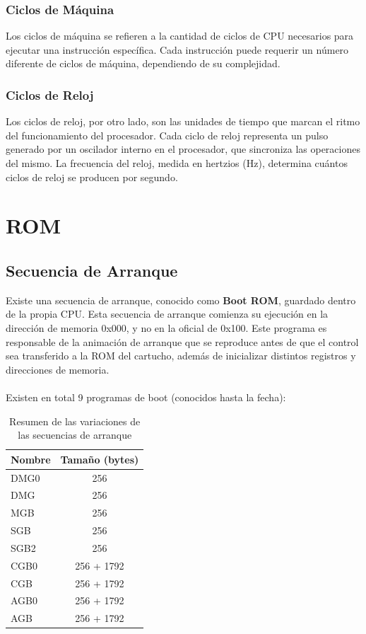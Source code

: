 \subsubsection{Ciclos de Máquina}
Los ciclos de máquina se refieren a la cantidad de ciclos de CPU necesarios para ejecutar una instrucción específica. Cada instrucción puede requerir un número diferente de ciclos de máquina, dependiendo de su complejidad.

\subsubsection{Ciclos de Reloj}
Los ciclos de reloj, por otro lado, son las unidades de tiempo que marcan el ritmo del funcionamiento del procesador. Cada ciclo de reloj representa un pulso generado por un oscilador interno en el procesador, que sincroniza las operaciones del mismo. La frecuencia del reloj, medida en hertzios (Hz), determina cuántos ciclos de reloj se producen por segundo.

\section{ROM}
\subsection{Secuencia de Arranque}

Existe una secuencia de arranque, conocido como \textbf{Boot ROM}, guardado dentro de la propia CPU. Esta secuencia de arranque comienza su ejecución en la dirección de memoria 0x000, y no en la oficial de 0x100. Este programa es responsable de la animación de arranque que se reproduce antes de que el control sea transferido a la ROM del cartucho, además de inicializar distintos registros y direcciones de memoria.
\\\\
Existen en total 9 programas de boot (conocidos hasta la fecha):
\begin{table}[h!]
\centering
\begin{tabular}{|l|c|}
\hline
\textbf{Nombre} & \textbf{Tamaño (bytes)} \\ \hline
DMG0 & 256 \\ \hline
DMG  & 256 \\ \hline
MGB  & 256 \\ \hline
SGB  & 256 \\ \hline
SGB2 & 256 \\ \hline
CGB0 & 256 + 1792 \\ \hline
CGB  & 256 + 1792 \\ \hline
AGB0 & 256 + 1792 \\ \hline
AGB  & 256 + 1792 \\ \hline
\end{tabular}
\caption{Resumen de las variaciones de las secuencias de arranque}
\end{table}


